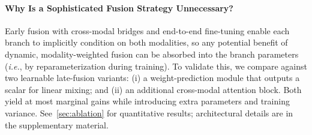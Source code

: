 \paragraph{Why Is a Sophisticated Fusion Strategy Unnecessary?}
Early fusion with cross-modal bridges and end-to-end fine-tuning enable each branch to implicitly condition on both modalities, so any potential benefit of dynamic, modality-weighted fusion can be absorbed into the branch parameters (\emph{i.e.}, by reparameterization during training). To validate this, we compare against two learnable late-fusion variants: (i) a weight-prediction module that outputs a scalar for linear mixing; and (ii) an additional cross-modal attention block. Both yield at most marginal gains while introducing extra parameters and training variance. See~\cref{sec:ablation} for quantitative results; architectural details are in the supplementary material.



